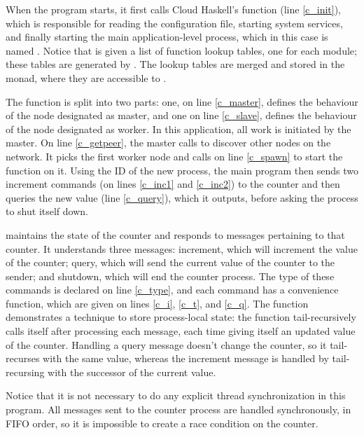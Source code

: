 \documentclass[preprint]{sigplanconf}
\begin{document}
When the program starts, it first calls Cloud Haskell's 
function  (line \ref{c_init}), which is responsible for reading the configuration file, starting system services, and finally starting the main application-level process, which in this case is named .
Notice that  is given a list of function lookup tables, one for each module; these tables are generated by . 
The lookup tables are merged and stored in the  monad, where they are accessible to .

The  function is split into two parts: one, on line \ref{c_master}, defines the behaviour of the node designated as master, and one on line \ref{c_slave}, defines the behaviour of the node designated as worker. 
In this application, all work is initiated by the master. On line \ref{c_getpeer}, the master calls  to discover other nodes on the network. It picks the first worker node and calls  on line \ref{c_spawn} to start the  function on it. Using the ID of the new process, the main program then sends two increment commands (on lines \ref{c_inc1} and \ref{c_inc2}) to the counter and then queries the new value (line \ref{c_query}), which it outputs, before asking the process to shut itself down.

 maintains the state of the counter and responds to messages pertaining to that counter. It understands three messages: increment, which will increment the value of the counter; query, which will send the current value of the counter to the sender; and shutdown, which will end the counter process. 
The type of these commands is declared on line \ref{c_type}, and each command has a convenience function, which are given on lines \ref{c_i}, \ref{c_t}, and \ref{c_q}. The  function demonstrates a technique to store process-local state: the function tail-recursively calls itself after processing each message, each time giving itself an updated value of the counter. Handling a query message doesn't change the counter, so it tail-recurses with the same value, whereas the increment message is handled by tail-recursing with the successor of the current value.

Notice that it is not necessary to do any explicit thread synchronization in this program. All messages sent to the counter process are handled synchronously, in FIFO order, so it is impossible to create a race condition on the counter.
\end{document}
